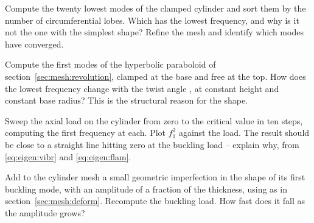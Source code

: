  Compute the twenty lowest modes of the
  clamped cylinder and sort them by the number of circumferential lobes.
  Which has the lowest frequency, and why is it not the one with the simplest
  shape? Refine the mesh and identify which modes have converged.

 Compute the first modes of the hyperbolic
  paraboloid of section~\ref{sec:mesh:revolution}, clamped at the base and
  free at the top. How does the lowest frequency change with the twist angle
  , at constant height and constant base radius? This is the
  structural reason for the shape.

 Sweep the axial load on the cylinder
  from zero to the critical value in ten steps, computing the first frequency
  at each. Plot $f_{1}^{2}$ against the load. The result should be close to a
  straight line hitting zero at the buckling load -- explain why, from
  \eqref{eq:eigen:vibr} and \eqref{eq:eigen:flam}.

 Add to the cylinder mesh a small
  geometric imperfection in the shape of its first buckling mode, with an
  amplitude of a fraction of the thickness, using  as in
  section~\ref{sec:mesh:deform}. Recompute the buckling load. How fast does
  it fall as the amplitude grows?

